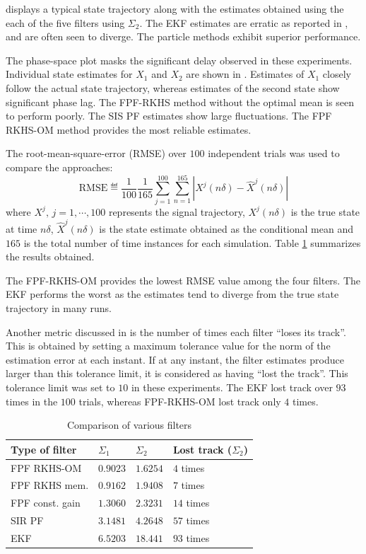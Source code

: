  displays a typical state trajectory along with the estimates obtained using the each of the five filters using  $\Sigma_2$. The EKF estimates are erratic as reported in \cite{budchelee07}, and are often seen to diverge. The particle methods exhibit superior performance.

The phase-space plot masks the significant delay observed in these experiments.   Individual state estimates for $X_{1}$ and $X_2$ are shown in .
Estimates of $X_1$ closely follow the actual state trajectory, whereas estimates of the second state  show  significant phase lag. The FPF-RKHS method without the optimal mean is seen to perform poorly. The SIS PF estimates show large fluctuations.
The FPF RKHS-OM method provides the most reliable estimates.

The root-mean-square-error (RMSE) over $100$ independent trials was used to compare the approaches:
\[
\text{RMSE} \eqdef \frac{1}{100} \frac{1}{165} \sum_{j=1}^{100}\sum_{n=1}^{165} | X^j(n \delta) - \hat{X}^j(n \delta) |
\]
where $X^j, \, j= 1 ,\cdots, 100$ represents the signal trajectory, $X^j(n\delta)$ is the true state at time $n\delta$, $\hat{X}^j(n\delta)$ is the state estimate obtained as the conditional mean and $165$ is the total number of time instances for each simulation. Table \ref{table:fpf_rmse} summarizes the results obtained.

The FPF-RKHS-OM provides the lowest RMSE value among the four filters. The EKF performs the worst as the estimates tend to diverge from the true state trajectory in many runs.

Another metric discussed in \cite{budchelee07} is the number of times each filter ``loses its track''. This is obtained by setting a maximum tolerance value for the norm of the estimation error at each instant. If at any instant, the filter estimates produce larger than this tolerance limit, it is considered as having ``lost the track''.   This tolerance limit was set to $10$ in these experiments. The EKF lost track over $93$ times in the $100$ trials, whereas FPF-RKHS-OM lost track only $4$ times.\
\begin{table}[htbp]
	\caption{Comparison of various filters}
		\begin{tabularx}{6.5in}{ XXXX }
			\hline
			Type of filter & $\Sigma_1$ & $\Sigma_2$ & Lost track ($\Sigma_2$) \\
			\hline
			FPF RKHS-OM & $0.9023$  &  $1.6254$ & $4$ times\\
			FPF RKHS mem. &$0.9162$ &  $ 1.9408$ & $ 7 $ times\\
			FPF const. gain & $1.3060$ & $2.3231$ & $14$ times \\
			SIR PF & $3.1481$  &  $4.2648$ &  $57$ times \\
			EKF &  $6.5203$ & $18.441$ & $93$ times \\ 		
			\hline
		\end{tabularx}
		\label{table:fpf_rmse}
\end{table}

